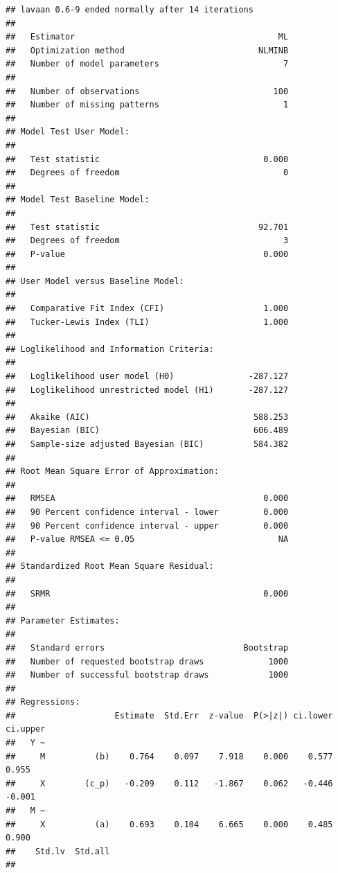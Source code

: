 \documentclass[
  11pt,
]{book}
\begin{document}
\begin{verbatim}
## lavaan 0.6-9 ended normally after 14 iterations
## 
##   Estimator                                         ML
##   Optimization method                           NLMINB
##   Number of model parameters                         7
##                                                       
##   Number of observations                           100
##   Number of missing patterns                         1
##                                                       
## Model Test User Model:
##                                                       
##   Test statistic                                 0.000
##   Degrees of freedom                                 0
## 
## Model Test Baseline Model:
## 
##   Test statistic                                92.701
##   Degrees of freedom                                 3
##   P-value                                        0.000
## 
## User Model versus Baseline Model:
## 
##   Comparative Fit Index (CFI)                    1.000
##   Tucker-Lewis Index (TLI)                       1.000
## 
## Loglikelihood and Information Criteria:
## 
##   Loglikelihood user model (H0)               -287.127
##   Loglikelihood unrestricted model (H1)       -287.127
##                                                       
##   Akaike (AIC)                                 588.253
##   Bayesian (BIC)                               606.489
##   Sample-size adjusted Bayesian (BIC)          584.382
## 
## Root Mean Square Error of Approximation:
## 
##   RMSEA                                          0.000
##   90 Percent confidence interval - lower         0.000
##   90 Percent confidence interval - upper         0.000
##   P-value RMSEA <= 0.05                             NA
## 
## Standardized Root Mean Square Residual:
## 
##   SRMR                                           0.000
## 
## Parameter Estimates:
## 
##   Standard errors                            Bootstrap
##   Number of requested bootstrap draws             1000
##   Number of successful bootstrap draws            1000
## 
## Regressions:
##                    Estimate  Std.Err  z-value  P(>|z|) ci.lower ci.upper
##   Y ~                                                                   
##     M          (b)    0.764    0.097    7.918    0.000    0.577    0.955
##     X        (c_p)   -0.209    0.112   -1.867    0.062   -0.446   -0.001
##   M ~                                                                   
##     X          (a)    0.693    0.104    6.665    0.000    0.485    0.900
##    Std.lv  Std.all
##                   

\end{verbatim}
\end{document}
